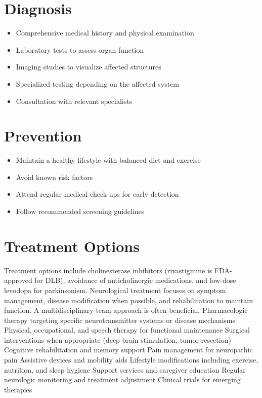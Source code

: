 \section{Diagnosis}
\begin{itemize}[noitemsep]
  \item Comprehensive medical history and physical examination
  \item Laboratory tests to assess organ function
  \item Imaging studies to visualize affected structures
  \item Specialized testing depending on the affected system
  \item Consultation with relevant specialists
\end{itemize}
\section{Prevention}
\begin{itemize}[noitemsep]
  \item Maintain a healthy lifestyle with balanced diet and exercise
  \item Avoid known risk factors
  \item Attend regular medical check-ups for early detection
  \item Follow recommended screening guidelines
\end{itemize}
\section{Treatment Options}
Treatment options include cholinesterase inhibitors (rivastigmine is FDA-approved for DLB), avoidance of anticholinergic medications, and low-dose levodopa for parkinsonism. Neurological treatment focuses on symptom management, disease modification when possible, and rehabilitation to maintain function. A multidisciplinary team approach is often beneficial. Pharmacologic therapy targeting specific neurotransmitter systems or disease mechanisms Physical, occupational, and speech therapy for functional maintenance Surgical interventions when appropriate (deep brain stimulation, tumor resection) Cognitive rehabilitation and memory support Pain management for neuropathic pain Assistive devices and mobility aids Lifestyle modifications including exercise, nutrition, and sleep hygiene Support services and caregiver education Regular neurologic monitoring and treatment adjustment Clinical trials for emerging therapies

